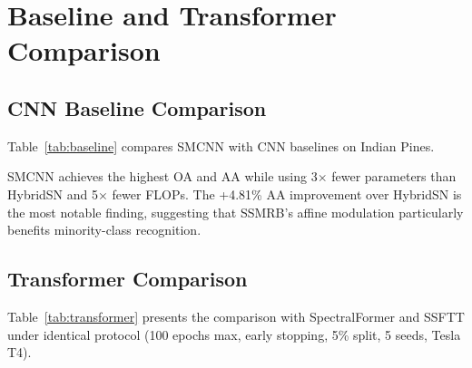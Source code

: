 \documentclass[conference]{IEEEtran}
\begin{document}
{\section{Baseline and Transformer Comparison}

\subsection{CNN Baseline Comparison}

Table~\ref{tab:baseline} compares SMCNN with CNN baselines on Indian Pines.

\begin{table}[!t]
\caption{Baseline Comparison on Indian Pines}
\label{tab:baseline}
\centering
{}
\end{table}

SMCNN achieves the highest OA and AA while using 3$\times$ fewer parameters than HybridSN and 5$\times$ fewer FLOPs. The +4.81\% AA improvement over HybridSN is the most notable finding, suggesting that SSMRB's affine modulation particularly benefits minority-class recognition.

\subsection{Transformer Comparison}

Table~\ref{tab:transformer} presents the comparison with SpectralFormer and SSFTT under identical protocol (100 epochs max, early stopping, 5\% split, 5 seeds, Tesla T4).

}
\end{document}
